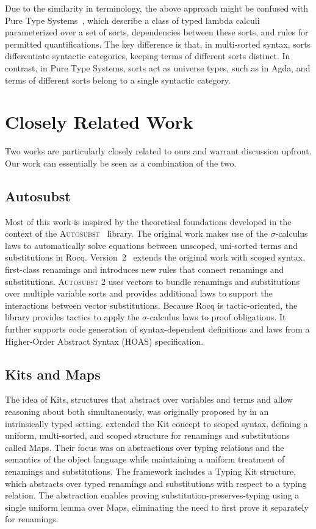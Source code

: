 \documentclass[screen,nonacm]{acmart}
\begin{document}
Due to the similarity in terminology, the above approach might be confused with
Pure Type Systems~\cite{berardi1988towards, 10.1007/3-540-52592-0_53,
      terlouw1989een}, which describe a class of typed lambda calculi parameterized
over a set of sorts, dependencies between these sorts, and rules for permitted
quantifications. The key difference is that, in multi-sorted syntax, sorts
differentiate syntactic categories, keeping terms of different sorts distinct.
In contrast, in Pure Type Systems, sorts act as universe types, such as
 in Agda, and terms of different sorts belong to a single
syntactic category.

\section{Closely Related Work}\label{sec:rel}
Two works are particularly closely related to ours and warrant discussion
upfront. Our work can essentially be seen as a combination of the two.

\subsection{Autosubst}
Most of this work is inspired by the theoretical foundations developed in the
context of the \textsc{Autosubst}~\cite{schafer2015autosubst} library. The
original work makes use of the $σ$-calculus laws to automatically solve
equations between unscoped, uni-sorted terms and substitutions in Rocq.
Version~2~\cite{10.1145/3293880.3294101, Stark:2020:Mechanising} extends the
original work with scoped syntax, first-class renamings and introduces new
rules that connect renamings and substitutions. \textsc{Autosubst 2} uses
vectors to bundle renamings and substitutions over multiple variable sorts and
provides additional laws to support the interactions between vector
substitutions. Because Rocq is tactic-oriented, the library provides tactics to
apply the $σ$-calculus laws to proof obligations. It further supports code
generation of syntax-dependent definitions and laws from a Higher-Order
Abstract Syntax (HOAS) specification.

\subsection{Kits and Maps}
The idea of Kits, structures that abstract over variables and terms and allow
reasoning about both simultaneously, was originally proposed by \citet{ren-sub}
in an intrinsically typed setting. \citet{saffrich:LIPIcs.ITP.2024.32} extended
the Kit concept to scoped syntax, defining a uniform, multi-sorted, and scoped
structure for renamings and substitutions called Maps. Their focus was on
abstractions over typing relations and the semantics of the object language
while maintaining a uniform treatment of renamings and substitutions. The
framework includes a Typing Kit structure, which abstracts over typed renamings
and substitutions with respect to a typing relation. The abstraction enables
proving substitution-preserves-typing using a single uniform lemma over Maps,
eliminating the need to first prove it separately for renamings.
\end{document}
